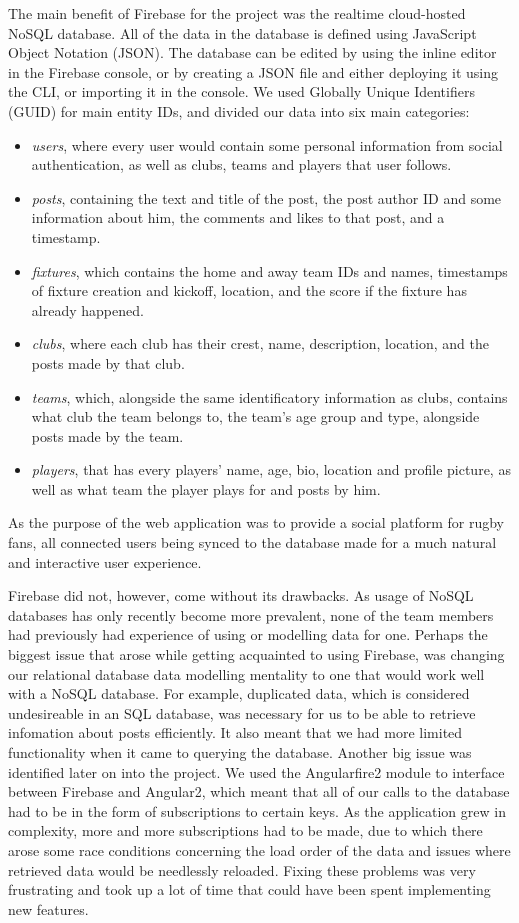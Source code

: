 \documentclass{l3proj}
\begin{document}
The main benefit of Firebase for the project was the realtime cloud-hosted NoSQL database.
All of the data in the database is defined using JavaScript Object Notation (JSON).
The database can be edited by using the inline editor in the Firebase console, or by creating a JSON file and either deploying it using the CLI, or importing it in the console.
We used Globally Unique Identifiers (GUID) for main entity IDs, and divided our data into six main categories:
\begin{itemize}
\item \textit{users}, where every user would contain some personal information from social authentication, as well as clubs, teams and players that user follows.
\item \textit{posts}, containing the text and title of the post, the post author ID and some information about him, the comments and likes to that post, and a timestamp.
\item \textit{fixtures}, which contains the home and away team IDs and names, timestamps of fixture creation and kickoff, location, and the score if the fixture has already happened.
\item \textit{clubs}, where each club has their crest, name, description, location, and the posts made by that club.
\item \textit{teams}, which, alongside the same identificatory information as clubs, contains what club the team belongs to, the team's age group and type, alongside posts made by the team.
\item \textit{players}, that has every players' name, age, bio, location and profile picture, as well as what team the player plays for and posts by him.
\end{itemize}
As the purpose of the web application was to provide a social platform for rugby fans, all connected users being synced to the database made for a much natural and interactive user experience.

Firebase did not, however, come without its drawbacks. As usage of NoSQL databases has only recently become more prevalent, none of the team members had previously had experience of using or modelling data for one.
Perhaps the biggest issue that arose while getting acquainted to using Firebase, was changing our relational database data modelling mentality to one that would work well with a NoSQL database. For example, duplicated data, which is considered undesireable in an SQL database, was necessary for us to be able to retrieve infomation about posts efficiently. It also meant that we had more limited functionality when it came to querying the database.
Another big issue was identified later on into the project. We used the Angularfire2 module to interface between Firebase and Angular2, which meant that all of our calls to the database had to be in the form of subscriptions to certain keys.
As the application grew in complexity, more and more subscriptions had to be made, due to which there arose some race conditions concerning the load order of the data and issues where retrieved data would be needlessly reloaded. Fixing these problems was very frustrating and took up a lot of time that could have been spent implementing new features.
\end{document}
